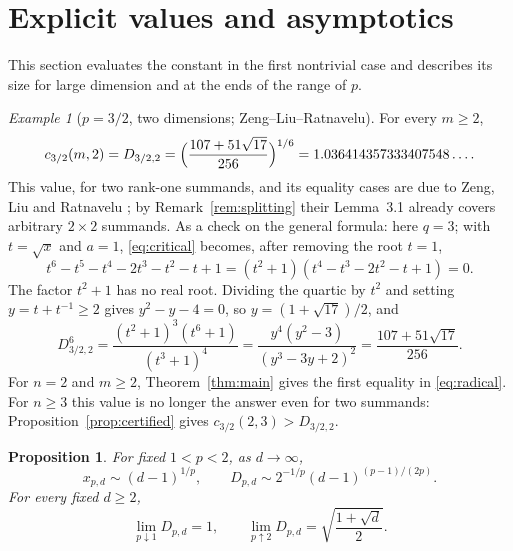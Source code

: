 \documentclass[11pt,a4paper]{article}
\numberwithin{equation}{section}
\newtheorem{proposition}[theorem]{Proposition}
\theoremstyle{definition}
\theoremstyle{remark}
\newtheorem{example}[theorem]{Example}
\begin{document}
\section{Explicit values and asymptotics}\label{sec:values}

This section evaluates the constant in the first nontrivial case and
describes its size for large dimension and at the ends of the range of
\(p\).

\begin{example}[\(p=3/2\), two dimensions; Zeng--Liu--Ratnavelu]\label{ex:radical}
For every \(m\ge2\),
\begin{equation}\label{eq:radical}
 c_{3/2}(m,2)=D_{3/2,2}=\Bigl(\frac{107+51\sqrt{17}}{256}\Bigr)^{1/6}
 =1.036414357333407548\ldots .
\end{equation}
This value, for two rank-one summands, and its equality cases are due to
Zeng, Liu and Ratnavelu \cite[Theorem 1.1]{ZengExact}; by
Remark~\ref{rem:splitting} their Lemma~3.1 already covers arbitrary
\(2\times2\) summands. As a check on the general formula: here \(q=3\);
with \(t=\sqrt x\) and \(a=1\), \eqref{eq:critical} becomes, after
removing the root \(t=1\),
\[
 t^6-t^5-t^4-2t^3-t^2-t+1=(t^2+1)(t^4-t^3-2t^2-t+1)=0 .
\]
The factor \(t^2+1\) has no real root. Dividing the quartic by \(t^2\)
and setting \(y=t+t^{-1}\ge2\) gives \(y^2-y-4=0\), so
\(y=(1+\sqrt{17})/2\), and
\[
 D_{3/2,2}^6=\frac{(t^2+1)^3(t^6+1)}{(t^3+1)^4}
 =\frac{y^4(y^2-3)}{(y^3-3y+2)^2}=\frac{107+51\sqrt{17}}{256}.
\]
For \(n=2\) and \(m\ge2\), Theorem~\ref{thm:main} gives the first equality
in \eqref{eq:radical}. For \(n\ge3\) this value is no longer the answer
even for two summands: Proposition~\ref{prop:certified} gives
\(c_{3/2}(2,3)>D_{3/2,2}\).
\end{example}

\begin{proposition}\label{prop:asymptotic}
For fixed \(1<p<2\), as \(d\to\infty\),
\begin{equation}\label{eq:asymptotic}
 x_{p,d}\sim(d-1)^{1/p},
 \qquad
 D_{p,d}\sim2^{-1/p}(d-1)^{(p-1)/(2p)} .
\end{equation}
For every fixed \(d\ge2\),
\begin{equation}\label{eq:endpoints}
 \lim_{p\downarrow1}D_{p,d}=1,
 \qquad
 \lim_{p\uparrow2}D_{p,d}=\sqrt{\frac{1+\sqrt d}{2}} .
\end{equation}
\end{proposition}
\end{document}
